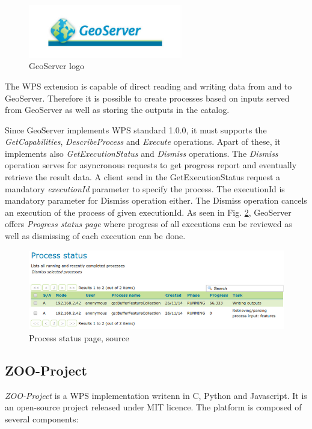 \documentclass[12pt,a4paper]{article}
\begin{document}
\begin{figure}[h!]
\centering
\includegraphics[width=0.6\textwidth]{img/geoserver.jpg}
\caption{GeoServer logo}
\label{fig:geoserver_logo}
\end{figure}

The WPS extension is capable of direct reading and writing data from and to GeoServer. Therefore it is possible to create processes
based on inputs served from GeoServer as well as storing the outputs in the catalog.

Since GeoServer implements WPS standard 1.0.0, it must supports the \textit{GetCapabilities}, \textit{DescribeProcess} and \textit{Execute}
operations. Apart of these, it implements also \textit{GetExecutionStatus} and \textit{Dismiss} operations. The \textit{Dismiss} operation
serves for asyncronous requests to get progress report and eventually retrieve the result data. A client send in the GetExecutionStatus
request a mandatory \textit{executionId} parameter to specify the process. The executionId is mandatory parameter for Dismiss operation
either. The Dismiss operation cancels an execution of the process of given executionId. As seen in Fig. \ref{fig:geoserver_status},
GeoServer offers \textit{Progress status page} where progress of all executions can be reviewed as well as dismissing of each execution
can be done.

\begin{figure}[h!]
\centering
\includegraphics[width=\textwidth]{img/geoserver_status.png}
\caption{Process status page, source \cite{GS_docs}}
\label{fig:geoserver_status}
\end{figure}

\subsection{ZOO-Project}
\textit{ZOO-Project} is a WPS implementation writenn in C, Python and Javascript. It is an open-source project released under MIT licence.
The platform is composed of several components:
\end{document}
